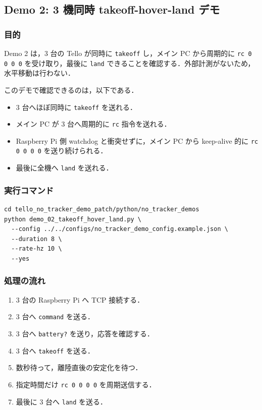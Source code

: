 \subsection{Demo 2: 3 機同時 takeoff-hover-land デモ}

\subsubsection{目的}

Demo 2 は，3 台の Tello が同時に \texttt{takeoff} し，メイン PC から周期的に \texttt{rc 0 0 0 0} を受け取り，最後に \texttt{land} できることを確認する．外部計測がないため，水平移動は行わない．

このデモで確認できるのは，以下である．

\begin{itemize}
  \item 3 台へほぼ同時に \texttt{takeoff} を送れる．
  \item メイン PC が 3 台へ周期的に \texttt{rc} 指令を送れる．
  \item Raspberry Pi 側 watchdog と衝突せずに，メイン PC から keep-alive 的に \texttt{rc 0 0 0 0} を送り続けられる．
  \item 最後に全機へ \texttt{land} を送れる．
\end{itemize}

\subsubsection{実行コマンド}

\begin{lstlisting}
cd tello_no_tracker_demo_patch/python/no_tracker_demos
python demo_02_takeoff_hover_land.py \
  --config ../../configs/no_tracker_demo_config.example.json \
  --duration 8 \
  --rate-hz 10 \
  --yes
\end{lstlisting}

\subsubsection{処理の流れ}

\begin{enumerate}
  \item 3 台の Raspberry Pi へ TCP 接続する．
  \item 3 台へ \texttt{command} を送る．
  \item 3 台へ \texttt{battery?} を送り，応答を確認する．
  \item 3 台へ \texttt{takeoff} を送る．
  \item 数秒待って，離陸直後の安定化を待つ．
  \item 指定時間だけ \texttt{rc 0 0 0 0} を周期送信する．
  \item 最後に 3 台へ \texttt{land} を送る．
\end{enumerate}

